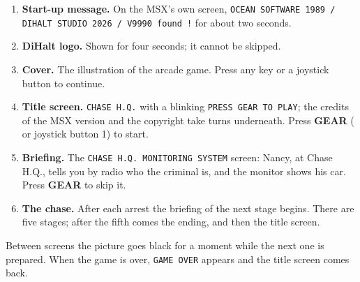 \begin{enumerate}
\item \textbf{Start-up message.} On the MSX's own screen, \texttt{OCEAN SOFTWARE 1989 / DIHALT STUDIO 2026 / V9990 found !} for about two seconds.
\item \textbf{DiHalt logo.} Shown for four seconds; it cannot be skipped.
\item \textbf{Cover.} The illustration of the arcade game. Press any key or a joystick button to continue.
\item \textbf{Title screen.} \texttt{CHASE H.Q.} with a blinking \texttt{PRESS GEAR TO PLAY}; the credits of the MSX version and the copyright take turns underneath. Press \textbf{GEAR} ( or joystick button 1) to start.
\item \textbf{Briefing.} The \texttt{CHASE H.Q. MONITORING SYSTEM} screen: Nancy, at Chase H.Q., tells you by radio who the criminal is, and the monitor shows his car. Press \textbf{GEAR} to skip it.
\item \textbf{The chase.} After each arrest the briefing of the next stage begins. There are five stages; after the fifth comes the ending, and then the title screen.
\end{enumerate}

Between screens the picture goes black for a moment while the next one is prepared. When the game is over, \texttt{GAME OVER} appears and the title screen comes back.
